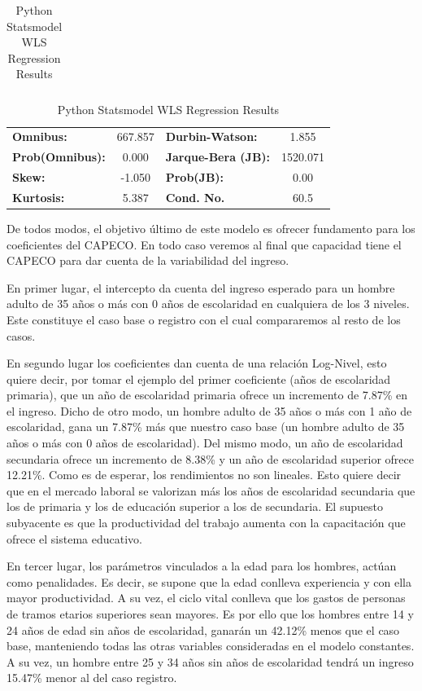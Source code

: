 \begin{table}
\begin{tabular}{lccccc}
    	\end{tabular}
    	\begin{tabular}{lclc}
    		\textbf{Omnibus:}       & 667.857 & \textbf{  Durbin-Watson:     } &    1.855  \\
    		\textbf{Prob(Omnibus):} &   0.000 & \textbf{  Jarque-Bera (JB):  } & 1520.071  \\
    		\textbf{Skew:}          &  -1.050 & \textbf{  Prob(JB):          } &     0.00  \\
    		\textbf{Kurtosis:}      &   5.387 & \textbf{  Cond. No.          } &     60.5  \\
    		
    	\end{tabular}
    	\caption{Python Statsmodel WLS Regression Results}
    	\label{tab:modelo}
    \end{table}

De todos modos, el objetivo último de este modelo es ofrecer fundamento para los coeficientes del CAPECO. En todo caso veremos al final que capacidad tiene el CAPECO para dar cuenta de la variabilidad del ingreso.

En primer lugar, el intercepto da cuenta del ingreso esperado para un hombre adulto de 35 años o más con 0 años de escolaridad en cualquiera de los 3 niveles. Este constituye el caso base o registro con el cual compararemos al resto de los casos.

En segundo lugar los coeficientes dan cuenta de una relación Log-Nivel, esto quiere decir, por tomar el ejemplo del primer coeficiente (años de escolaridad primaria), que un año de escolaridad primaria ofrece un incremento de 7.87\% en el ingreso. Dicho de otro modo, un hombre adulto de 35 años o más con 1 año de escolaridad, gana un 7.87\% más que nuestro caso base (un hombre adulto de 35 años o más con 0 años de escolaridad). Del mismo modo, un año de escolaridad secundaria ofrece un incremento de 8.38\% y un año de escolaridad superior ofrece 12.21\%. Como es de esperar, los rendimientos no son lineales. Esto quiere decir que en el mercado laboral se valorizan más los años de escolaridad secundaria que los de primaria y los de educación superior a los de secundaria. El supuesto subyacente es que la productividad del trabajo aumenta con la capacitación que ofrece el sistema educativo.

En tercer lugar, los parámetros vinculados a la edad para los hombres, actúan como penalidades. Es decir, se supone que la edad conlleva experiencia y con ella mayor productividad. A su vez, el ciclo vital conlleva que los gastos de personas de tramos etarios superiores sean mayores. Es por ello que los hombres entre 14 y 24 años de edad sin años de escolaridad, ganarán un 42.12\% menos que el caso base, manteniendo todas las otras variables consideradas en el modelo constantes. A su vez, un hombre entre 25 y 34 años sin años de escolaridad tendrá un ingreso 15.47\% menor al del caso registro.

